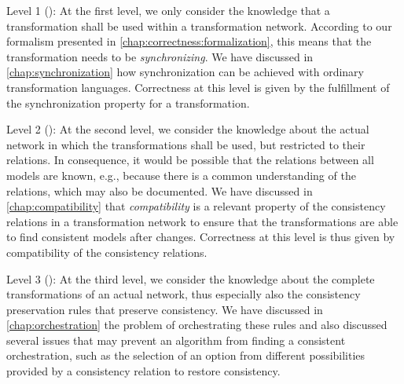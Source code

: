 
\begin{properdescription}
\item[Level 1 (\emph{\LevelTransformation}):] 
At the first level, we only consider the knowledge that a transformation shall be used within a transformation network.
According to our formalism presented in \autoref{chap:correctness:formalization}, this means that the transformation needs to be \emph{synchronizing}.
We have discussed in \autoref{chap:synchronization} how synchronization can be achieved with ordinary transformation languages.
Correctness at this level is given by the fulfillment of the synchronization property for a transformation.

\item[Level 2 (\emph{\LevelNetworkRelation}):] 
At the second level, we consider the knowledge about the actual network in which the transformations shall be used, but restricted to their relations.
In consequence, it would be possible that the relations between all models are known, e.g., because there is a common understanding of the relations, which may also be documented.
We have discussed in \autoref{chap:compatibility} that \emph{compatibility} is a relevant property of the consistency relations in a transformation network to ensure that the transformations are able to find consistent models after changes.
Correctness at this level is thus given by compatibility of the consistency relations.

\item[Level 3 (\emph{\LevelNetworkRule}):] 
At the third level, we consider the knowledge about the complete transformations of an actual network, thus especially also the consistency preservation rules that preserve consistency.
We have discussed in \autoref{chap:orchestration} the problem of orchestrating these rules and also discussed several issues that may prevent an algorithm from finding a consistent orchestration, such as the selection of an option from different possibilities provided by a consistency relation to restore consistency.

\end{properdescription}

